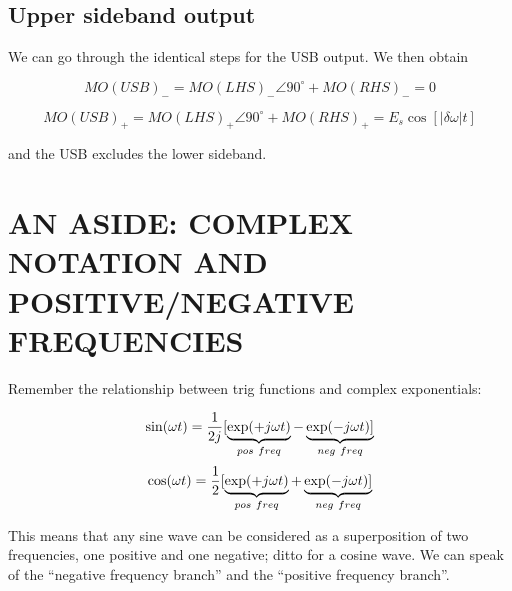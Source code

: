\documentclass[11pt,preprint]{aastex}
\begin{document}
\subsection{Upper sideband output}

        We can go through the identical steps for the USB output. We
then obtain

\begin{mathletters}
\begin{equation}
MO(USB)_- =  MO(LHS)_- \angle 90^\circ  + MO(RHS)_- = 0
\end{equation}

\begin{equation}
MO(USB)_+ = MO(LHS)_+   \angle 90^\circ + MO(RHS)_+ =
        E_s  \cos [|\delta \omega | t]
\end{equation}
\end{mathletters}

\noindent and the USB excludes the lower sideband.



\section{AN ASIDE: COMPLEX NOTATION AND POSITIVE/NEGATIVE FREQUENCIES}
\label{complex}

        Remember the relationship between trig functions and complex
exponentials:
                                                                        
       
\begin{mathletters} \label{cossin}
\begin{equation}
\sin(\omega t) = {1\over 2j} [\underbrace{\exp(+j\omega t)}_{pos\ freq}
        - \underbrace{\exp(-j\omega t)]}_{neg\ freq}
\end{equation}
\begin{equation}
\cos(\omega t) = {1\over 2} [\underbrace{\exp(+j\omega t)}_{pos\ freq}
        + \underbrace{\exp(-j\omega t)]}_{neg\ freq}
\end{equation}
\end{mathletters}
                                                                        
       
\noindent This means that any sine wave can be considered as a
superposition of two frequencies, one positive and one negative; ditto
for a cosine wave. We can speak of the ``negative frequency branch'' and
the
``positive frequency branch''.
                                                                        
\end{document}
